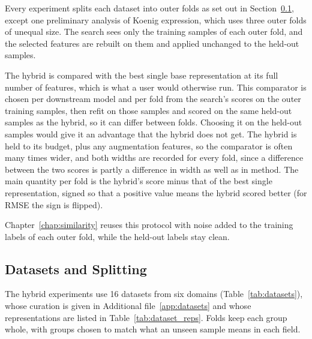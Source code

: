 Every experiment splits each dataset into outer folds as set out in Section~\ref{sec:method:datasets}, except one preliminary analysis of Koenig expression, which uses three outer folds of unequal size. The search sees only the training samples of each outer fold, and the selected features are rebuilt on them and applied unchanged to the held-out samples.

The hybrid is compared with the best single base representation at its full number of features, which is what a user would otherwise run. This comparator is chosen per downstream model and per fold from the search's scores on the outer training samples, then refit on those samples and scored on the same held-out samples as the hybrid, so it can differ between folds. Choosing it on the held-out samples would give it an advantage that the hybrid does not get. The hybrid is held to its budget, plus any augmentation features, so the comparator is often many times wider, and both widths are recorded for every fold, since a difference between the two scores is partly a difference in width as well as in method. The main quantity per fold is the hybrid's score minus that of the best single representation, signed so that a positive value means the hybrid scored better (for RMSE the sign is flipped).

Chapter~\ref{chap:similarity} reuses this protocol with noise added to the training labels of each outer fold, while the held-out labels stay clean.


\subsection{Datasets and Splitting}\label{sec:method:datasets}

The hybrid experiments use 16 datasets from six domains (Table~\ref{tab:datasets}), whose curation is given in Additional file~\ref{app:datasets} and whose representations are listed in Table~\ref{tab:dataset_reps}. Folds keep each group whole, with groups chosen to match what an unseen sample means in each field.

